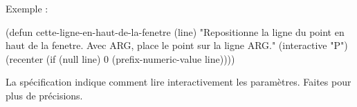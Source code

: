 Exemple :

\beginexample%
(defun cette-ligne-en-haut-de-la-fenetre (line)
  "Repositionne la ligne du point en haut de la fenetre.
Avec ARG, place le point sur la ligne ARG."
  (interactive "P")
  (recenter (if (null line)
                0
              (prefix-numeric-value line))))
\endexample

La sp\'ecification  indique comment lire
interactivement les param\`etres. Faites  pour
plus de pr\'ecisions.

\copyrightnotice

\bye


